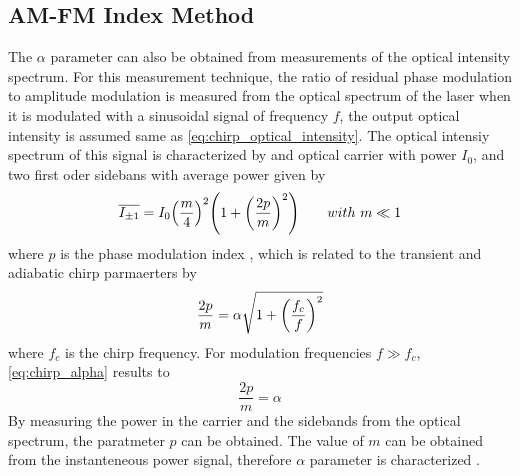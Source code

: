 \subsection{AM-FM Index Method}
The $\alpha$ parameter can also be obtained from measurements of the optical intensity spectrum. For this measurement technique, the ratio of residual phase modulation to amplitude modulation is measured from the optical spectrum of the laser when it is modulated with a sinusoidal signal of frequency $f$, the output optical intensity is assumed same as \autoref{eq:chirp_optical_intensity}. The optical intensiy spectrum of this signal is characterized by and optical carrier with power $I_0$, and two first oder sidebans with average power given by \cite{harder1983measurement}
\begin{equation}
    \overline{I_{\pm 1}}=I_0\qty(\frac{m}{4})^2\qty(1+\qty(\frac{2p}{m})^2) \qquad with \ m \ll 1
\end{equation}
where $p$ is the phase modulation index \cite{harder1983measurement}, which is related to the transient and adiabatic chirp parmaerters by \cite{bjerkan1996measurement}
\begin{equation}
    \frac{2p}{m}=\alpha\sqrt{1+\qty(\frac{f_c}{f})^2}
    \label{eq:chirp_alpha}
\end{equation}
where $f_c$ is the chirp frequency. For modulation frequencies $f \gg f_c$, \autoref{eq:chirp_alpha} results to \cite{harder1983measurement}
\begin{equation}
    \frac{2p}{m}=\alpha
    \label{eq:chirp_alpha_2}
\end{equation}
By measuring the power in the carrier and the sidebands from the optical spectrum, the paratmeter $p$ can be obtained. The value of $m$ can be obtained from the instanteneous power signal, therefore $\alpha$ parameter is characterized \cite{harder1983measurement, villafranca2007precise}.

